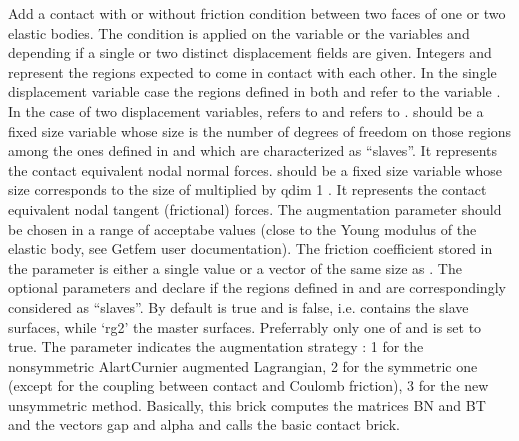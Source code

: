 \documentclass[a4paper,11pt,english]{sphinxmanual}
\begin{document}
\begin{fulllineitems}
\begin{fulllineitems}
Add a contact with or without friction condition between two faces of
one or two elastic bodies. The condition is applied on the variable
 or the variables  and  depending
if a single or two distinct displacement fields are given. Integers
 and  represent the regions expected to come in contact with
each other. In the single displacement variable case the regions defined
in both  and  refer to the variable . In the case
of two displacement variables,  refers to  and 
refers to .  should be a fixed size variable
whose size is the number of degrees of freedom on those regions among
the ones defined in  and  which are characterized as “slaves”.
It represents the contact equivalent nodal normal forces. 
should be a fixed size variable whose size corresponds to the size of
 multiplied by qdim \sphinxhyphen{} 1 . It represents the contact
equivalent nodal tangent (frictional) forces. The augmentation parameter
 should be chosen in a range of acceptabe values (close to the Young
modulus of the elastic body, see Getfem user documentation). The
friction coefficient stored in the parameter  is either a single
value or a vector of the same size as . The optional
parameters  and  declare if the regions defined in 
and  are correspondingly considered as “slaves”. By default
 is true and  is false, i.e.  contains the slave
surfaces, while ‘rg2’ the master surfaces. Preferrably only one of
 and  is set to true.  The parameter 
indicates the augmentation strategy : 1 for the non\sphinxhyphen{}symmetric
Alart\sphinxhyphen{}Curnier augmented Lagrangian, 2 for the symmetric one (except for
the coupling between contact and Coulomb friction),
3 for the new unsymmetric method.
Basically, this brick computes the matrices BN and BT and the vectors
gap and alpha and calls the basic contact brick.

\end{fulllineitems}


\end{fulllineitems}
\end{document}
